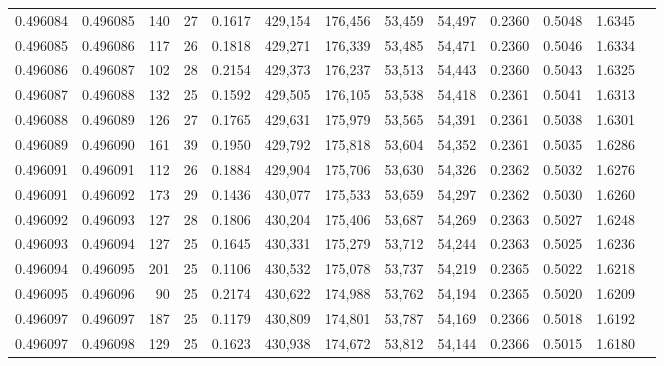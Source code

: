 \begin{tabular}{rrrrrrrrrrrrr}
0.496084 & 0.496085 & 140 &  27 &                                     0.1617 & 429,154 & 176,456 &  53,459 &  54,497 & 0.2360 & 0.5048 & 1.6345 \\
0.496085 & 0.496086 & 117 &  26 &                                     0.1818 & 429,271 & 176,339 &  53,485 &  54,471 & 0.2360 & 0.5046 & 1.6334 \\
0.496086 & 0.496087 & 102 &  28 &                                     0.2154 & 429,373 & 176,237 &  53,513 &  54,443 & 0.2360 & 0.5043 & 1.6325 \\
0.496087 & 0.496088 & 132 &  25 &                                     0.1592 & 429,505 & 176,105 &  53,538 &  54,418 & 0.2361 & 0.5041 & 1.6313 \\
0.496088 & 0.496089 & 126 &  27 &                                     0.1765 & 429,631 & 175,979 &  53,565 &  54,391 & 0.2361 & 0.5038 & 1.6301 \\
0.496089 & 0.496090 & 161 &  39 &                                     0.1950 & 429,792 & 175,818 &  53,604 &  54,352 & 0.2361 & 0.5035 & 1.6286 \\
0.496091 & 0.496091 & 112 &  26 &                                     0.1884 & 429,904 & 175,706 &  53,630 &  54,326 & 0.2362 & 0.5032 & 1.6276 \\
0.496091 & 0.496092 & 173 &  29 &                                     0.1436 & 430,077 & 175,533 &  53,659 &  54,297 & 0.2362 & 0.5030 & 1.6260 \\
0.496092 & 0.496093 & 127 &  28 &                                     0.1806 & 430,204 & 175,406 &  53,687 &  54,269 & 0.2363 & 0.5027 & 1.6248 \\
0.496093 & 0.496094 & 127 &  25 &                                     0.1645 & 430,331 & 175,279 &  53,712 &  54,244 & 0.2363 & 0.5025 & 1.6236 \\
0.496094 & 0.496095 & 201 &  25 &                                     0.1106 & 430,532 & 175,078 &  53,737 &  54,219 & 0.2365 & 0.5022 & 1.6218 \\
0.496095 & 0.496096 &  90 &  25 &                                     0.2174 & 430,622 & 174,988 &  53,762 &  54,194 & 0.2365 & 0.5020 & 1.6209 \\
0.496097 & 0.496097 & 187 &  25 &                                     0.1179 & 430,809 & 174,801 &  53,787 &  54,169 & 0.2366 & 0.5018 & 1.6192 \\
0.496097 & 0.496098 & 129 &  25 &                                     0.1623 & 430,938 & 174,672 &  53,812 &  54,144 & 0.2366 & 0.5015 & 1.6180 \\

\end{tabular}
